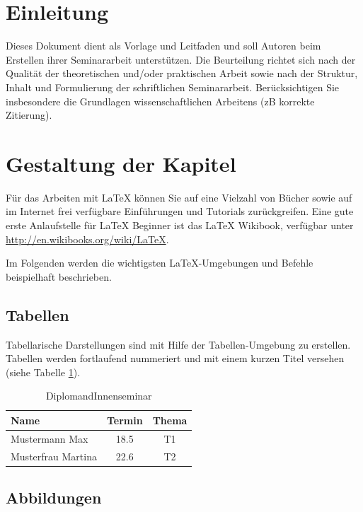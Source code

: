 \documentclass[deutsch]{llncs}
\begin{document}

\section{Einleitung}
\label{sec:intro}
Dieses Dokument dient als Vorlage und Leitfaden und soll Autoren beim Erstellen ihrer Seminararbeit unterstützen. Die Beurteilung richtet sich nach der Qualität der theoretischen und/oder praktischen Arbeit sowie nach der Struktur, Inhalt und Formulierung der schriftlichen Seminararbeit. Berücksichtigen Sie insbesondere die Grundlagen wissenschaftlichen Arbeitens (zB korrekte Zitierung).

\section{Gestaltung der Kapitel}
\label{sec:typo}

Für das Arbeiten mit LaTeX können Sie auf eine Vielzahl von Bücher sowie auf im Internet frei verfügbare Einführungen und Tutorials zurückgreifen. Eine gute erste Anlaufstelle für LaTeX  Beginner ist das LaTeX  Wikibook, verfügbar unter \url{http://en.wikibooks.org/wiki/LaTeX}.

Im Folgenden werden die wichtigsten LaTeX-Umgebungen und Befehle beispielhaft beschrieben.

\subsection{Tabellen}
\label{subsec:tables}

Tabellarische Darstellungen sind mit Hilfe der Tabellen-Umgebung zu erstellen. Tabellen werden fortlaufend nummeriert und mit einem kurzen Titel versehen (siehe Tabelle \ref{tab:diplomandenseminar}).

\begin{table}[htb]
	\caption{DiplomandInnenseminar}
	\label{tab:diplomandenseminar}
    \centering	
	\begin{tabular}{|l|c|c|}
		\hline \textbf{Name} & \textbf{Termin} & \textbf{Thema} \\
		\hline
		\hline Mustermann Max  & 18.5   & T1    \\
		\hline Musterfrau Martina  & 22.6   & T2    \\
		\hline
	\end{tabular}
\end{table}


\subsection{Abbildungen}
\label{subsec:fig}
\end{document}
